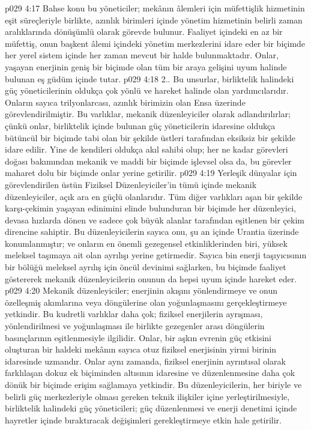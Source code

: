 \vs p029 4:17 Bahse konu bu yöneticiler; mekânın âlemleri için müfettişlik hizmetinin eşit süreçleriyle birlikte, azınlık birimleri içinde yönetim hizmetinin belirli zaman aralıklarında dönüşümlü olarak görevde bulunur. Faaliyet içindeki en az bir müfettiş, onun başkent âlemi içindeki yönetim merkezlerini idare eder bir biçimde her yerel sistem içinde her zaman mevcut bir halde bulunmaktadır. Onlar, yaşayan enerjinin geniş bir biçimde olan tüm bir araya gelişini uyum halinde bulunan eş güdüm içinde tutar.
\vs p029 4:18 2.\bibnobreakspace {}. Bu unsurlar, birliktelik halindeki güç yöneticilerinin oldukça çok yönlü ve hareket halinde olan yardımcılarıdır. Onların sayıca trilyonlarcası, azınlık birimizin olan Ensa üzerinde görevlendirilmiştir. Bu varlıklar, mekanik düzenleyiciler olarak adlandırılırlar; çünkü onlar, birliktelik içinde bulunan güç yöneticilerin idaresine oldukça bütüncül bir biçimde tabi olan bir şekilde üstleri tarafından eksiksiz bir şekilde idare edilir. Yine de kendileri oldukça akıl sahibi olup; her ne kadar görevleri doğası bakımından mekanik ve maddi bir biçimde işlevsel olsa da, bu görevler maharet dolu bir biçimde onlar yerine getirilir.
\vs p029 4:19 Yerleşik dünyalar için görevlendirilen üstün Fiziksel Düzenleyiciler’in tümü içinde mekanik düzenleyiciler, açık ara en güçlü olanlarıdır. Tüm diğer varlıkları aşan bir şekilde karşı\hyp{}çekimin yaşayan edinimini elinde bulunduran bir biçimde her düzenleyici, devasa hızlarda dönen ve sadece çok büyük alanlar tarafından eşitlenen bir çekim direncine sahiptir. Bu düzenleyicilerin sayıca onu, şu an içinde Urantia üzerinde konumlanmıştır; ve onların en önemli gezegensel etkinliklerinden biri, yüksek meleksel taşımaya ait olan ayrılışı yerine getirmedir. Sayıca bin enerji taşıyıcısının bir bölüğü meleksel ayrılış için öncül devinimi sağlarken, bu biçimde faaliyet göstererek mekanik düzenleyicilerin onunun da hepsi uyum içinde hareket eder.
\vs p029 4:20 Mekanik düzenleyiciler; enerjinin akışını yönlendirmeye ve onun özelleşmiş akımlarına veya döngülerine olan yoğunlaşmasını gerçekleştirmeye yetkindir. Bu kudretli varlıklar daha çok; fiziksel enerjilerin ayrışması, yönlendirilmesi ve yoğunlaşması ile birlikte gezegenler arası döngülerin basınçlarının eşitlenmesiyle ilgilidir. Onlar, bir aşkın evrenin güç etkisini oluşturan bir haldeki mekânın sayıca otuz fiziksel enerjisinin yirmi birinin idaresinde uzmandır. Onlar aynı zamanda, fiziksel enerjinin ayrıntısal olarak farklılaşan dokuz ek biçiminden altısının idaresine ve düzenlenmesine daha çok dönük bir biçimde erişim sağlamaya yetkindir. Bu düzenleyicilerin, her biriyle ve belirli güç merkezleriyle olması gereken teknik ilişkiler içine yerleştirilmesiyle, birliktelik halindeki güç yöneticileri; güç düzenlenmesi ve enerji denetimi içinde hayretler içinde bıraktıracak değişimleri gerekleştirmeye etkin hale getirilir.
